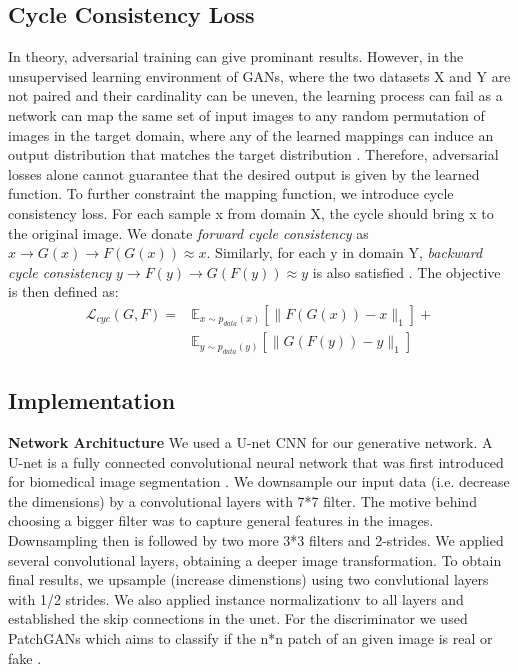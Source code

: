 \documentclass[10pt,twocolumn,letterpaper]{article}
\begin{document}
\subsection{Cycle Consistency Loss}
In theory, adversarial training can give prominant results. However, in the unsupervised learning environment of GANs, where the two datasets X and Y are not paired and their cardinality can be uneven, the learning process can fail as a network can map the same set of input images to any random permutation of images in the target domain, where any of the learned mappings can induce an output distribution that matches the target distribution \cite{cyclegan}. Therefore, adversarial losses alone cannot guarantee that the desired output is given by the learned function. To further constraint the mapping function, we introduce cycle consistency loss. For each sample x from domain X, the cycle should bring x to the original image. We donate \emph{forward cycle consistency} as $x \rightarrow G(x)\rightarrow F(G(x)) \approx x$. Similarly, for each y in domain Y, \emph{backward cycle consistency} $y \rightarrow F(y)\rightarrow G(F(y)) \approx y$ is also satisfied \cite{cyclegan}. The objective is then defined as:
\begin{equation}
	\begin{split}
		\mathcal{L}_{cyc}(G,F) = & \mathbb{E}_{x \sim p_{data}(x)} [\| F(G(x))-x \| _1] + \\
				& \mathbb{E}_{y \sim p_{data}(y)} [\| G(F(y))-y \| _1]
	\end{split}
\end{equation}



\subsection{Implementation}
\textbf{Network Architucture} We used a U-net CNN for our generative network. A U-net is a fully connected convolutional neural network that was first introduced for biomedical image segmentation \cite{unet}. We downsample our input data (i.e. decrease the dimensions) by a convolutional layers with 7*7 filter. The motive behind choosing a bigger filter was to capture general features in the images. Downsampling then is followed by two more 3*3 filters and 2-strides. We applied several convolutional layers, obtaining a deeper image transformation.   To obtain final results, we upsample (increase dimenstions) using two convlutional layers with 1/2 strides. We also applied instance normalizationv \cite{insnorm} to all layers and established the skip connections in the unet. For the discriminator we used PatchGANs which aims to classify if the n*n patch of an given image is real or fake \cite{imgtoimg}. 
\end{document}
